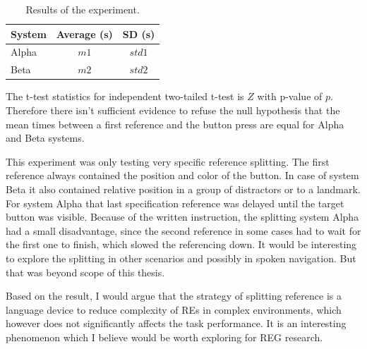 \begin{table}[!htbp]
 \centering
\begin{tabular}{lcc}
\toprule
System   & Average (s) & SD (s)  \\
\midrule
Alpha   & $m1$ & $std1$ \\
Beta 	& $m2$ & $std2$ \\
\bottomrule
\end{tabular}
\caption{Results of the experiment.}
\label{tab:meanexper}
\end{table}

The t-test statistics for independent two-tailed t-test is $Z$ with p-value of $p$. Therefore there isn't sufficient evidence to refuse the null hypothesis that the mean times between a first reference and the button press are equal for Alpha and Beta systems.

This experiment was only testing very specific reference splitting. The first reference always contained the position and color of the button. In case of system Beta it also contained relative position in a group of distractors or to a landmark. For system Alpha that last specification reference was delayed until the target button was visible. Because of the written instruction, the splitting system Alpha had a small disadvantage, since the second reference in some cases had to wait for the first one to finish, which slowed the referencing down. It would be interesting to explore the splitting in other scenarios and possibly in spoken navigation. But that was beyond scope of this thesis.

Based on the result, I would argue that the strategy of splitting reference is a language device to reduce complexity of REs in complex environments, which however does not significantly affects the task performance. It is an interesting phenomenon which I believe would be worth exploring for REG research.